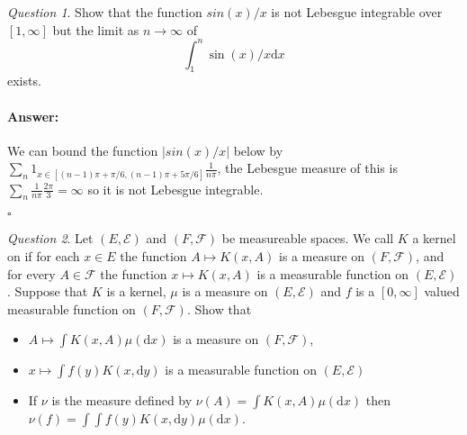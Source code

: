 \documentclass[11pt]{article}
\theoremstyle{definition}
\theoremstyle{remark}
\newtheorem{q}{Question}
\newenvironment{ans}{\paragraph{Answer:}}{\hfill$\square$\vspace{10pt}}
\begin{document}
\begin{q}
Show that the function $sin(x)/x$ is not Lebesgue integrable over $[1,\infty]$ but the limit as $n \rightarrow \infty$ of 
\[ \int_1^n \sin(x)/x \mathrm{d}x \] exists.
\end{q}
\begin{ans}
We can bound the function $|sin(x)/x|$ below by $\sum_n 1_{x \in [(n-1)\pi + \pi/6, (n-1)\pi + 5\pi/6]} \frac{1}{n\pi}$, the Lebesgue measure of this is $\sum_n \frac{1}{n\pi} \frac{2\pi}{3} = \infty$ so it is not Lebesgue integrable. 


\end{ans}

\begin{q}
 Let $(E, \mathcal{E})$ and $(F, \mathcal{F})$ be measureable spaces. We call $K$ a kernel on if for each $x \in E$ the function $A \mapsto K(x, A)$ is a measure on $(F, \mathcal{F})$, and for every $A \in \mathcal{F}$ the function $x \mapsto K(x,A)$ is a measurable function on $(E, \mathcal{E})$. Suppose that $K$ is a kernel, $\mu$ is a measure on $(E, \mathcal{E})$ and $f$ is a $[0,\infty]$ valued measurable function on $(F, \mathcal{F})$. Show that
\begin{itemize}
\item $A \mapsto \int K(x,A) \mu(\mathrm{d}x)$ is a measure on $(F, \mathcal{F})$,
\item $x \mapsto \int f(y) K(x, \mathrm{d}y)$ is a measurable function on $(E, \mathcal{E})$ 
\item If $\nu$ is the measure defined by $\nu(A) = \int K(x,A) \mu(\mathrm{d}x)$ then $\nu(f) = \int \int f(y) K(x, \mathrm{d}y) \mu(\mathrm{d}x)$. 
\end{itemize}
\end{q}
\end{document}
